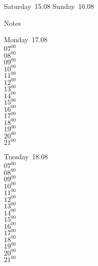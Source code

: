 \documentclass[11pt,a4paper]{book}\usepackage[]{graphicx}\usepackage[]{color}
\begin{document}
\begin{weekendbox}
  Saturday~15.08
  \tcblower
  Sunday~16.08
\end{weekendbox} %
\begin{notebox}
  Notes
\end{notebox}
\clearpage
\begin{headerbox}
\end{headerbox}
\begin{weekdaybox}
  Monday~17.08\\
  { 
  \vfill
  $07^{00}$\\
$08^{00}$\\
$09^{00}$\\
$10^{00}$\\
$11^{00}$\\
$12^{00}$\\
$13^{00}$\\
$14^{00}$\\
$15^{00}$\\
$16^{00}$\\
$17^{00}$\\
$18^{00}$\\
$19^{00}$\\
$20^{00}$\\
$21^{00}$\\
  }
\end{weekdaybox}
\begin{weekdaybox}
  Tuesday~18.08\\
  { 
  \vfill
  $07^{00}$\\
$08^{00}$\\
$09^{00}$\\
$10^{00}$\\
$11^{00}$\\
$12^{00}$\\
$13^{00}$\\
$14^{00}$\\
$15^{00}$\\
$16^{00}$\\
$17^{00}$\\
$18^{00}$\\
$19^{00}$\\
$20^{00}$\\
$21^{00}$\\
  }
\end{weekdaybox}
\end{document}
